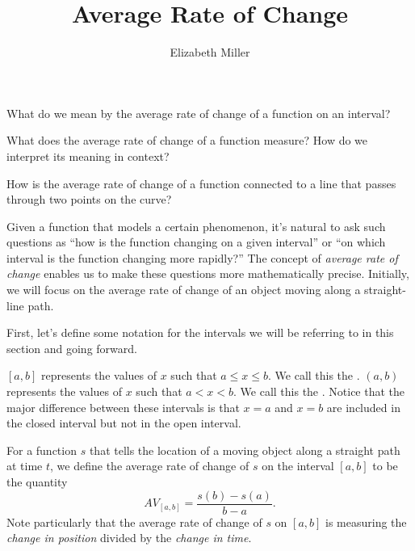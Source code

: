 \documentclass[nooutcomes]{ximera}
\author{Elizabeth Miller}
\title{Average Rate of Change}
\begin{document}
\begin{abstract}
  
\end{abstract}
\maketitle



\begin{motivatingQuestions}
\item What do we mean by the average rate of change of a function on an interval?
\item What does the average rate of change of a function measure?  How do we interpret its meaning in context?
\item How is the average rate of change of a function connected to a line that passes through two points on the curve?
\end{motivatingQuestions}



Given a function that models a certain phenomenon, it's natural to ask such questions as ``how is the function changing on a given interval'' or ``on which interval is the function changing more rapidly?'' The concept of \emph{average rate of change} enables us to make these questions more mathematically precise. Initially, we will focus on the average rate of change of an object moving along a straight-line path.

First, let's define some notation for the intervals we will be referring to in this section and going forward.

\begin{definition}
$[a, b]$ represents the values of $x$ such that $a \leq x \leq b$.  We call this the .
$(a, b)$ represents the values of $x$ such that $a < x < b$.  We call this the .
Notice that the major difference between these intervals is that $x=a$ and $x=b$ are included in the closed interval but not in the open interval.
\end{definition}

For a function \(s\) that tells the location of a moving object along a straight path at time \(t\), we define the average rate of change of \(s\) on the interval \([a,b]\) to be the quantity%
\begin{equation*}
AV_{[a,b]} = \frac{s(b)-s(a)}{b-a}\text{.}
\end{equation*}
 Note particularly that the average rate of change of \(s\) on \([a,b]\) is measuring the \emph{change in position} divided by the \emph{change in time}.%
\end{document}
